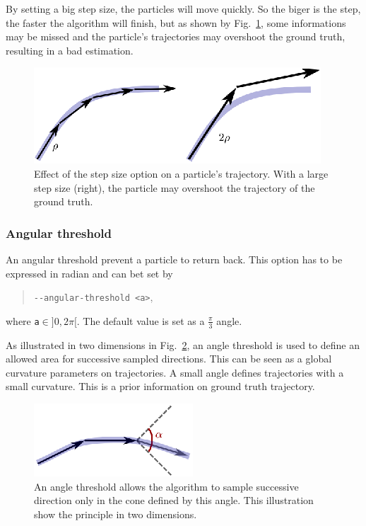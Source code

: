         By setting a big step size, the particles will move quickly. So the biger is the step, the faster the algorithm will finish, but as shown by Fig.~\ref{tracto-fig:stepSize}, some informations may be missed and the particle's trajectories may overshoot the ground truth, resulting in a bad estimation.

        \begin{figure}
            \centering
            \includegraphics[height=0.1\textheight]{stepSize}
            \caption{Effect of the step size option on a particle's trajectory. With a large step size (right), the particle may overshoot the trajectory of the ground truth.}
            \label{tracto-fig:stepSize}
        \end{figure}


    \subsubsection*{Angular threshold}
        An angular threshold prevent a particle to return back. This option has to be expressed in radian and can bet set by
            \begin{quote}
                \texttt{-\hspace{0.1mm}-angular-threshold <a>},
            \end{quote}
        where \texttt{a}$\in]0,2\pi[$. The default value is set as a $\tfrac{\pi}{3}$ angle.

        As illustrated in two dimensions in Fig.~\ref{tracto-fig:angleThreshold}, an angle threshold is used to define an allowed area for successive sampled directions. This can be seen as a global curvature parameters on trajectories. A small angle defines trajectories with a small curvature. This is a prior information on ground truth trajectory.

        \begin{figure}
            \centering
            \includegraphics[height=0.1\textheight]{angleThreshold}
            \caption{An angle threshold allows the algorithm to sample successive direction only in the cone defined by this angle. This illustration show the principle in two dimensions.}
            \label{tracto-fig:angleThreshold}
        \end{figure}


